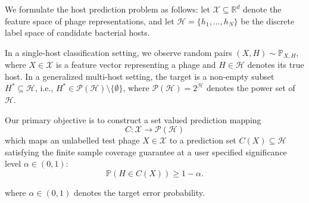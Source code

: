 We formulate the host prediction problem as follows: let $\mathcal{X} \subseteq \mathbb{R}^{d}$ denote the feature space 
of phage representations, and let $\mathcal{H} = \{h_{1}, \dots, h_{N}\}$ be the discrete label space of candidate bacterial
hosts.

In a single-host classification setting, we observe random pairs $(X, H) \sim \mathbb{P}_{X, H}$, where $X \in \mathcal{X}$ is 
a feature vector representing a phage and $H \in \mathcal{H}$ denotes its true host. In a generalized multi-host setting, the 
target is a non-empty subset $H^* \subseteq \mathcal{H}$, i.e., $H^* \in \mathcal{P}(\mathcal{H}) \setminus \{\emptyset\}$, 
where $\mathcal{P}(\mathcal{H}) = 2^{\mathcal{H}}$ denotes the power set of $\mathcal{H}$.

Our primary objective is to construct a set valued prediction mapping
\begin{equation}
C: \mathcal{X} \longrightarrow \mathcal{P}(\mathcal{H})
\end{equation}
which maps an unlabelled test phage $X \in \mathcal{X}$ to a prediction set $C(X) \subseteq \mathcal{H}$ satisfying the finite 
sample coverage guarantee at a user specified significance level $\alpha \in (0, 1)$:
\begin{equation}
\mathbb{P}(H \in C(X)) \ge 1 - \alpha.
\end{equation}

where $\alpha \in (0,1)$ denotes the target error probability.
